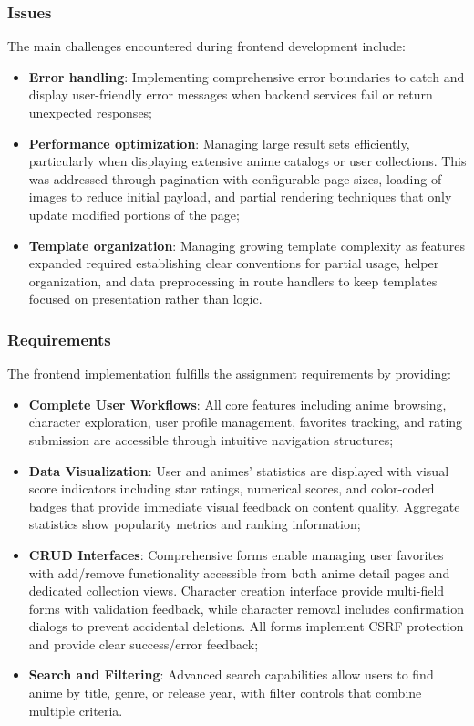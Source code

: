 \documentclass[11pt,a4paper]{article}
\begin{document}
\subsubsection{Issues}
The main challenges encountered during frontend development include:
\begin{itemize}
    \item \textbf{Error handling}: Implementing comprehensive error boundaries to catch and display user-friendly error messages when backend services fail or return unexpected responses;
    \item \textbf{Performance optimization}: Managing large result sets efficiently, particularly when displaying extensive anime catalogs or user collections. This was addressed through pagination with configurable page sizes, loading of images to reduce initial payload, and partial rendering techniques that only update modified portions of the page;
    \item \textbf{Template organization}: Managing growing template complexity as features expanded required establishing clear conventions for partial usage, helper organization, and data preprocessing in route handlers to keep templates focused on presentation rather than logic.
\end{itemize}

\subsubsection{Requirements}
The frontend implementation fulfills the assignment requirements by providing:
\begin{itemize}
    \item \textbf{Complete User Workflows}: All core features including anime browsing, character exploration, user profile management, favorites tracking, and rating submission are accessible through intuitive navigation structures;
    \item \textbf{Data Visualization}: User and animes' statistics are displayed with visual score indicators including star ratings, numerical scores, and color-coded badges that provide immediate visual feedback on content quality. Aggregate statistics show popularity metrics and ranking information;
    \item \textbf{CRUD Interfaces}: Comprehensive forms enable managing user favorites with add/remove functionality accessible from both anime detail pages and dedicated collection views. Character creation interface provide multi-field forms with validation feedback, while character removal includes confirmation dialogs to prevent accidental deletions. All forms implement CSRF protection and provide clear success/error feedback;
    \item \textbf{Search and Filtering}: Advanced search capabilities allow users to find anime by title, genre, or release year, with filter controls that combine multiple criteria.
\end{itemize}
\end{document}
